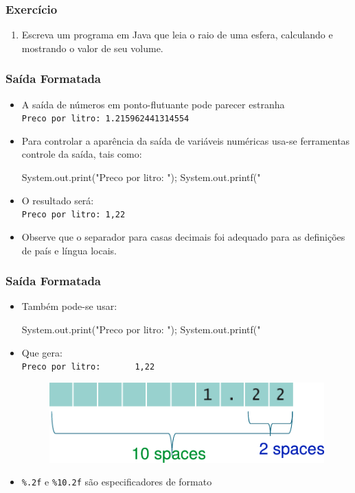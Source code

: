 \documentclass[xcolor={dvipsnames,table},aspectratio=169]{beamer}
\begin{document}
\begin{frame}\frametitle{Exercício}
\begin{enumerate}
	\item Escreva um programa em Java que leia o raio de uma esfera, calculando e mostrando o valor de seu volume.
\end{enumerate}
\end{frame}

\begin{frame}[fragile]\frametitle{Saída Formatada}
\begin{itemize}
	\item A saída de números em ponto-flutuante pode parecer estranha\\ \texttt{Preco por litro: 1.215962441314554}
	\item Para controlar a aparência da saída de variáveis numéricas usa-se ferramentas controle da saída, tais como:
\begin{javacode}
System.out.print("Preco por litro: ");
System.out.printf("%
\end{javacode}
	\item O resultado será:\\ \texttt{Preco por litro: 1,22}
	\item Observe que o separador para casas decimais foi adequado para as definições de país e língua locais.
\end{itemize}
\end{frame}

\begin{frame}[fragile]\frametitle{Saída Formatada}
\begin{itemize}
	\item Também pode-se usar:
\begin{javacode}
System.out.print("Preco por litro: ");
System.out.printf("%
\end{javacode}
	\item Que gera:\\ \texttt{Preco por litro: ~~~~~~1,22}
\begin{figure}[h]
	\includegraphics[height=0.15\paperheight,left]{pucrs-ep-fprog-unidade_02-tipos_de_dados_fundamentais-laminas-formatacao.png}
\end{figure}
	\item \texttt{\%.2f} e \texttt{\%10.2f} são especificadores de formato
\end{itemize}
\end{frame}
\end{document}
